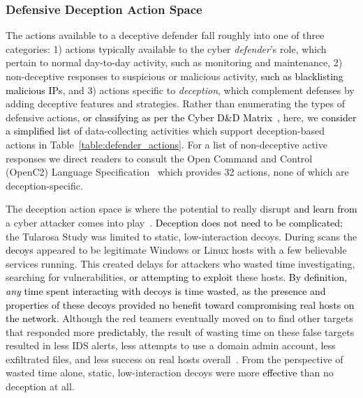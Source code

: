 \documentclass{article}
\newcommand\mmm[1]{\textcolor{black}{#1}}
\newcommand\kjf[1]{\textcolor{black}{#1}}
\newcommand\nnn[1]{\textcolor{black}{#1}}
\begin{document}
\subsubsection{Defensive Deception Action Space}\label{sub:defender_actions}

The actions available to a deceptive defender fall roughly into one of three categories: 1) actions typically available to the cyber \textit{defender}'s role, which pertain to normal day-to-day activity, such as monitoring and maintenance, 2) non-deceptive responses to suspicious or malicious activity, \nnn{such as blacklisting malicious IPs}, and 3) actions specific to \textit{deception}, which complement defenses by adding deceptive features and strategies. Rather than enumerating the types of defensive actions\mmm{, or classifying as per the Cyber D\&D Matrix~\cite{heckman_cyber_2015},}  here, we \mmm{consider a simplified list of} data-collecting activities which support deception-based actions in Table~\ref{table:defender_actions}. For a list of non-deceptive active responses we direct readers to consult the Open Command and Control (OpenC2) Language Specification~\cite{openC2} which provides 32 actions, none of which are deception-specific.

The deception action space is where the potential to really disrupt \nnn{and learn from} a cyber attacker comes into play~\cite{fugate2019}. 
\nnn{Deception does not need to be complicated;} the Tularosa Study was limited to static, low-interaction decoys. During scans the \nnn{decoys} appeared to be legitimate Windows or Linux hosts with a few believable services running. This created delays for attackers who wasted time investigating, searching for vulnerabilities, \kjf{or attempting to exploit} these hosts. \mmm{By definition, \textit{any} time spent interacting with decoys is time wasted, as the presence and properties of these decoys provided no benefit toward compromising real hosts on the network.} Although the red teamers eventually moved on to find other targets that responded more \kjf{predictably}, the result of wasting time on these false targets resulted in less IDS alerts, less attempts to use a domain admin account, less exfiltrated files, and less success on real hosts overall~\cite{usenix-2021}. From the perspective of wasted time alone, static, low-interaction decoys were more \kjf{effective} than no deception at all. 
\end{document}
